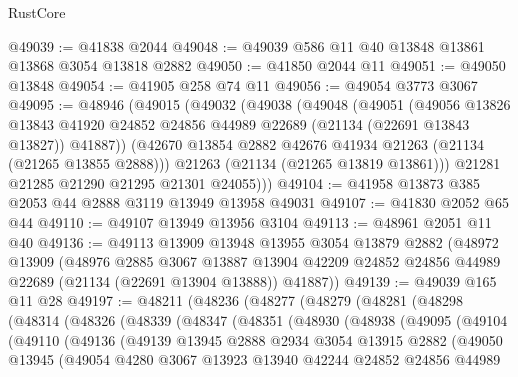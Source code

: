 \begin{lexlean}{RustCore}
\begin{coremodule}
@49039 := @41838 @2044
@49048 := @49039 @586 @11 @40 @13848 @13861 @13868 @3054 @13818 @2882
@49050 := @41850 @2044 @11
@49051 := @49050 @13848
@49054 := @41905 @258 @74 @11
@49056 := @49054 @3773 @3067
@49095 := @48946
    (@49015
      (@49032
        (@49038
          (@49048
            (@49051
              (@49056
                @13826
                @13843
                @41920
                @24852
                @24856
                @44989
                @22689
                (@21134 (@22691 @13843 @13827))
                @41887))
            (@42670 @13854 @2882 @42676 @41934 @21263 (@21134 (@21265 @13855 @2888)))
            @21263
            (@21134 (@21265 @13819 @13861)))
          @21281
          @21285
          @21290
          @21295
          @21301
          @24055)))
@49104 := @41958 @13873 @385 @2053 @44 @2888 @3119 @13949 @13958 @49031
@49107 := @41830 @2052 @65 @44
@49110 := @49107 @13949 @13956 @3104
@49113 := @48961 @2051 @11 @40
@49136 := @49113
    @13909
    @13948
    @13955
    @3054
    @13879
    @2882
    (@48972
      @13909
      (@48976
        @2885
        @3067
        @13887
        @13904
        @42209
        @24852
        @24856
        @44989
        @22689
        (@21134 (@22691 @13904 @13888))
        @41887))
@49139 := @49039 @165 @11 @28
@49197 := @48211
    (@48236
      (@48277
        (@48279
          (@48281
            (@48298
              (@48314
                (@48326
                  (@48339
                    (@48347
                      (@48351
                        (@48930
                          (@48938
                            (@49095
                              (@49104
                                (@49110
                                  (@49136
                                    (@49139
                                      @13945
                                      @2888
                                      @2934
                                      @3054
                                      @13915
                                      @2882
                                      (@49050
                                        @13945
                                        (@49054
                                          @4280
                                          @3067
                                          @13923
                                          @13940
                                          @42244
                                          @24852
                                          @24856
                                          @44989

\end{coremodule}
\end{lexlean}
